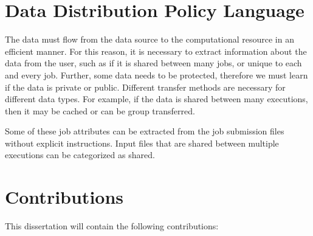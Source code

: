 \section{Data Distribution Policy Language}
The data must flow from the data source to the computational resource in an efficient manner.  For this reason, it is necessary to extract information about the data from the user, such as if it is shared between many jobs, or unique to each and every job.  Further, some data needs to be protected, therefore we must learn if the data is private or public.  Different transfer methods are necessary for different data types.  For example, if the data is shared between many executions, then it may be cached or can be group transferred.  

Some of these job attributes can be extracted from the job submission files without explicit instructions.  Input files that are shared between multiple executions can be categorized as shared.




\section{Contributions}

This dissertation will contain the following contributions:


